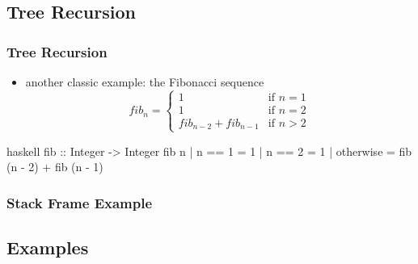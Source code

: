 \documentclass[dvipsnames]{beamer}
\theoremstyle{plain}
\begin{document}
\subsection{Tree Recursion}

\begin{frame}[fragile]
  \frametitle{Tree Recursion}

  \begin{itemize}
    \item another classic example: the Fibonacci sequence
    \[
      fib_n =
        \begin{cases}
          1                     & \mbox{if } n = 1\\
          1                     & \mbox{if } n = 2\\
          fib_{n-2} + fib_{n-1} & \mbox{if } n > 2
        \end{cases}
    \]
  \end{itemize}

  \begin{exampleblock}{}
    \begin{pygments}{haskell}
fib :: Integer -> Integer
fib n
  | n == 1    = 1
  | n == 2    = 1
  | otherwise = fib (n - 2) + fib (n - 1)
    \end{pygments}
  \end{exampleblock}
\end{frame}

\begin{frame}[fragile]
  \frametitle{Stack Frame Example}

  \begin{center}
  \end{center}
\end{frame}

\subsection{Examples}
\end{document}

